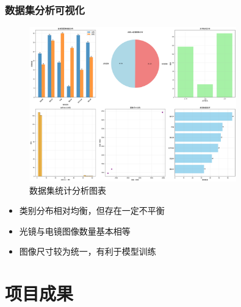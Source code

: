 \documentclass[10pt]{beamer}
\begin{document}
\begin{frame}
\frametitle{数据集分析可视化}
\begin{figure}
\centering
\includegraphics[width=0.8\textwidth]{dataset_analysis.png}
\caption{数据集统计分析图表}
\end{figure}

\begin{itemize}
    \item 类别分布相对均衡，但存在一定不平衡
    \item 光镜与电镜图像数量基本相等
    \item 图像尺寸较为统一，有利于模型训练
\end{itemize}
\end{frame}

\section{项目成果}
\end{document}
